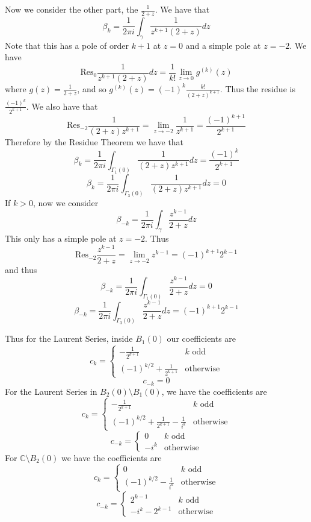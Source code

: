 \documentclass[11pt]{article}
\newcommand{\C}{\mathbb{C}}
\newcommand{\Res}{\text{Res}}
\begin{document}
\begin{enumerate}[(1)]
Now we consider the other part, the $\frac{1}{2 + z}$. 
We have that 
$$ \beta_k = \frac{1}{2\pi i} \int_\gamma \frac{1}{z^{k+1}(2+z)}dz $$
Note that this has a pole of order $k+1$ at $z = 0$ and a simple pole at $z = -2$. We have 
$$\Res_0 \frac{1}{z^{k+1}(2+z)}dz = \frac{1}{k!}\lim_{z \to 0} g^{(k)}(z) $$
where $g(z) = \frac{1}{2+z}$, and so $g^{(k)}(z) = (-1)^k \frac{k!}{(2+z)^{k+1}} $. Thus the residue is $\frac{(-1)^k}{2^{k+1}}$. We also have that 
$$ \Res_{-2} \frac{1}{(2+z)z^{k+1}} = \lim_{z \to -2} \frac{1}{z^{k+1}} = \frac{(-1)^{k+1}}{2^{k+1}} $$
Therefore by the Residue Theorem we have that 
$$ \beta_k = \frac{1}{2\pi i} \int_{\Gamma_1(0)} \frac{1}{(2+z)z^{k+1}} dz = \frac{(-1)^k}{2^{k+1}} $$
$$ \beta_k = \frac{1}{2\pi i}\int_{\Gamma_3(0)}\frac{1}{(2+z)z^{k+1}}dz = 0 $$
If $k > 0$, now we consider
$$ \beta_{-k} = \frac{1}{2\pi i} \int_\gamma \frac{z^{k-1}}{2 + z} dz $$
This only has a simple pole at $z = -2$. Thus 
$$ \Res_{-2} \frac{z^{k-1}}{2+z} = \lim_{z \to -2} z^{k-1} = (-1)^{k+1}2^{k-1} $$
and thus 
$$ \beta_{-k} = \frac{1}{2\pi i} \int_{\Gamma_1(0)} \frac{z^{k-1}}{2 + z} dz = 0 $$
$$  \beta_{-k} = \frac{1}{2\pi i} \int_{\Gamma_3(0)} \frac{z^{k-1}}{2 + z} dz = (-1)^{k+1}2^{k-1} $$

Thus for the Laurent Series, inside $B_1(0)$ our coefficients are 
$$ c_k = \begin{cases} -\frac{1}{2^{k+1}} & k \text{ odd} \\ (-1)^{k/2} + \frac{1}{2^{k+1}} & \text{otherwise} \end{cases}$$
$$ c_{-k} = 0 $$
For the Laurent Series in $B_2(0) \setminus B_1(0)$, we have the coefficients are 
$$ c_k = \begin{cases} -\frac{1}{2^{k+1}} & k \text{ odd} \\ (-1)^{k/2} + \frac{1}{2^{k+1}} - \frac{1}{i^k} & \text{otherwise} \end{cases} $$
$$ c_{-k} = \begin{cases} 0 & k \text{ odd} \\ -i^k & \text{otherwise} \end{cases} $$
For $\C \setminus B_2(0)$ we have the coefficients are 
$$ c_k = \begin{cases} 0 & k \text{ odd} \\ (-1)^{k/2} - \frac{1}{i^k} & \text{otherwise} \end{cases} $$
$$ c_{-k} = \begin{cases} 2^{k-1} & k\text{ odd} \\ -i^k - 2^{k-1} & \text{otherwise} \end{cases}$$


\end{enumerate}
\end{document}
